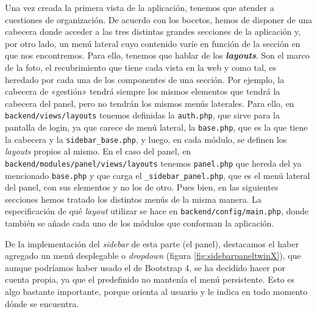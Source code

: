 Una vez creada la primera vista de la aplicación, tenemos que atender a cuestiones de organización. De acuerdo con los bocetos, hemos de disponer de una cabecera donde acceder a las tres distintas grandes secciones de la aplicación y, por otro lado, un menú lateral cuyo contenido varíe en función de la sección en que nos encontremos. Para ello, tenemos que hablar de los  \textbf{\textit{layouts}}. Son el marco de la foto, el recubrimiento que tiene cada vista en la web y como tal, es heredado por cada una de los componentes de una sección. Por ejemplo, la cabecera de «gestión» tendrá siempre los mismos elementos que tendrá la cabecera del panel, pero no tendrán los mismos menús laterales. Para ello, en \texttt{backend/views/layouts} tenemos definidas la \texttt{auth.php}, que sirve para la pantalla de login, ya que carece de menú lateral, la \texttt{base.php}, que es la que tiene la cabecera y la \texttt{sidebar\_base.php}, y luego, en cada módulo, se definen los \textit{layouts} propios al mismo. En el caso del panel, en \texttt{backend/modules/panel/views/layouts} tenemos \texttt{panel.php} que hereda del ya mencionado \texttt{base.php} y que carga el \texttt{\_sidebar\_panel.php}, que es el menú lateral del panel, con sus elementos y no los de otro. Pues bien, en las siguientes secciones hemos tratado los distintos menús de la misma manera. La especificación de qué \textit{layout} utilizar se hace en \texttt{backend/config/main.php}, donde también se añade cada uno de los módulos que conforman la aplicación.

De la implementación del \textit{sidebar} de esta parte (el panel), destacamos el haber agregado un menú desplegable o \textit{dropdown} (figura \ref{fig:sidebarpaneltwinX}), que aunque podríamos haber usado el de Bootstrap 4, se ha decidido hacer por cuenta propia, ya que el predefinido no mantenía el menú persistente. Esto es algo bastante importante, porque orienta al usuario y le indica en todo momento dónde se encuentra.

